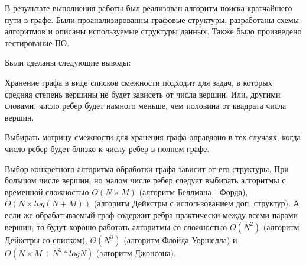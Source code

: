 \Conclusion

В результате выполнения работы был реализован алгоритм поиска кратчайшего пути в графе. Были проанализированны графовые структуры, разработаны схемы алгоритмов и описаны используемые структуры данных. Также было произведено тестирование ПО.

Были сделаны следующие выводы:

Хранение графа в виде списков смежности подходит для задач, в которых средняя степень вершины не будет зависеть от числа вершин. Или, другими словами, число ребер будет намного меньше, чем половина от квадрата числа вершин.

Выбирать матрицу смежности для хранения графа оправдано в тех случаях, когда число ребер будет близко к числу ребер в полном графе.

Выбор конкретного алгоритма обработки графа зависит от его структуры. При большом числе вершин, но малом числе ребер следует выбирать алгоритмы с временной сложностью $O(N\times M)$ (алгоритм Беллмана - Форда), $O(N\times log(N + M))$ (алгоритм Дейкстры с использованием доп. структур). А если же обрабатываемый граф содержит ребра практически между всеми парами вершин, то будут хорошо работать алгоритмы со сложностью $O(N^2)$ (алгоритм Дейкстры со списком), $O(N^3)$ (алгоритм Флойда-Уоршелла) и $O(N\times M + N^2*logN)$ (алгоритм Джонсона).